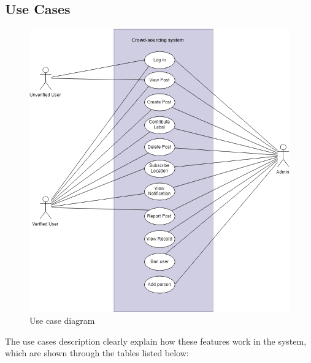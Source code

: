 \subsection{Use Cases}
\label{chap4:usecases}
\begin{center}
	\begin{figure}[H]
		\centering
		\includegraphics[width=0.75\columnwidth]{images/chap4/usecase.png}
		\caption{Use case diagram}
		\label{chap4:user_case_diagram}
	\end{figure}
\end{center}
The use cases description clearly explain how these features work in the system, which are shown through the tables listed below:
